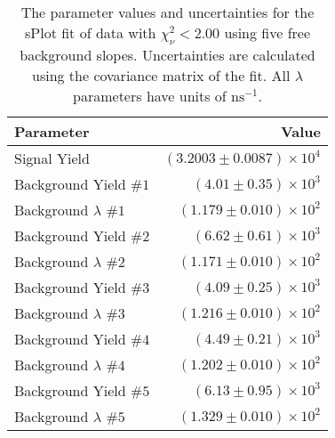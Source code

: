 
\begin{table}[ht]
    \begin{center}
        \begin{tabular}{lr}\toprule
            Parameter & Value \\\midrule
            Signal Yield & $(3.2003 \pm 0.0087) \times 10^{4}$ \\
            Background Yield $\#1$ & $(4.01 \pm 0.35) \times 10^{3}$ \\
            Background $\lambda$ $\#1$ & $(1.179 \pm 0.010) \times 10^{2}$ \\
            Background Yield $\#2$ & $(6.62 \pm 0.61) \times 10^{3}$ \\
            Background $\lambda$ $\#2$ & $(1.171 \pm 0.010) \times 10^{2}$ \\
            Background Yield $\#3$ & $(4.09 \pm 0.25) \times 10^{3}$ \\
            Background $\lambda$ $\#3$ & $(1.216 \pm 0.010) \times 10^{2}$ \\
            Background Yield $\#4$ & $(4.49 \pm 0.21) \times 10^{3}$ \\
            Background $\lambda$ $\#4$ & $(1.202 \pm 0.010) \times 10^{2}$ \\
            Background Yield $\#5$ & $(6.13 \pm 0.95) \times 10^{3}$ \\
            Background $\lambda$ $\#5$ & $(1.329 \pm 0.010) \times 10^{2}$ \\\bottomrule
        \end{tabular}
        \caption{The parameter values and uncertainties for the sPlot fit of data with $\chi^2_\nu < 2.00$ using five free background slopes. Uncertainties are calculated using the covariance matrix of the fit. All $\lambda$ parameters have units of $\si{\nano\second}^{-1}$.}\label{tab:splot-fit-results-chisqdof-2.00-free-5}
    \end{center}
\end{table}
